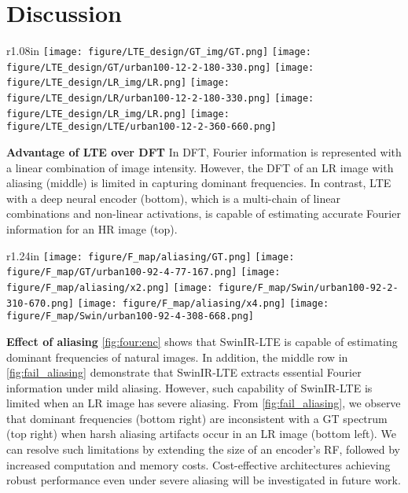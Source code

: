 \documentclass[10pt,twocolumn,letterpaper]{article}
\begin{document}
\section{Discussion}
\label{sec:dis}
\begingroup
\setlength{\columnsep}{10pt}
\setlength\intextsep{0pt}
\begin{wrapfigure}{r}{1.08in}
\centering
\texttt{[image: figure/LTE\_design/GT\_img/GT.png]}
\texttt{[image: figure/LTE\_design/GT/urban100-12-2-180-330.png]}
\texttt{[image: figure/LTE\_design/LR\_img/LR.png]}
\texttt{[image: figure/LTE\_design/LR/urban100-12-2-180-330.png]}
\texttt{[image: figure/LTE\_design/LR\_img/LR.png]}
\texttt{[image: figure/LTE\_design/LTE/urban100-12-2-360-660.png]}


\vspace{-6pt}
\caption{DFT and LTE}
\label{fig:LTE_design}
\end{wrapfigure}
\textbf{Advantage of LTE over DFT} In DFT, Fourier information is represented with a linear combination of image intensity. However, the DFT of an LR image with aliasing (middle) is limited in capturing dominant frequencies. In contrast, LTE with a deep neural encoder (bottom), which is a multi-chain of linear combinations and non-linear activations, is capable of estimating accurate Fourier information for an HR image (top).

\endgroup

\begingroup
\setlength{\columnsep}{10pt}
\setlength\intextsep{0pt}
\begin{wrapfigure}{r}{1.24in}
\centering
\texttt{[image: figure/F\_map/aliasing/GT.png]}
\texttt{[image: figure/F\_map/GT/urban100-92-4-77-167.png]}
\texttt{[image: figure/F\_map/aliasing/x2.png]}
\texttt{[image: figure/F\_map/Swin/urban100-92-2-310-670.png]}
\texttt{[image: figure/F\_map/aliasing/x4.png]}
\texttt{[image: figure/F\_map/Swin/urban100-92-4-308-668.png]}

\vspace{-6pt}
\caption{Aliasing.}
\label{fig:fail_aliasing}
\end{wrapfigure}
\textbf{Effect of aliasing} \cref{fig:four:enc} shows that SwinIR-LTE is capable of estimating dominant frequencies of natural images. In addition, the middle row in \cref{fig:fail_aliasing}  demonstrate that SwinIR-LTE extracts essential Fourier information under mild aliasing. However, such capability of SwinIR-LTE is limited when an LR image has severe aliasing. From \cref{fig:fail_aliasing}, we observe that dominant frequencies (bottom right) are inconsistent with a GT spectrum (top right) when harsh aliasing artifacts occur in an LR image (bottom left). We can resolve such limitations by extending the size of an encoder's RF, followed by increased computation and memory costs. Cost-effective architectures achieving robust performance even under severe aliasing will be investigated in future work.
\end{document}
